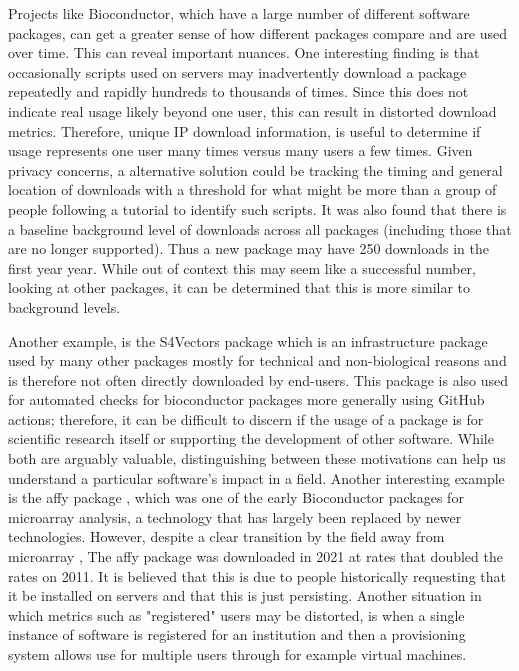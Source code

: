 \documentclass{article}
\begin{document}
Projects like Bioconductor, which have a large number of different software packages, can get a greater sense of how different packages compare and are used over time. This can reveal important nuances. One interesting finding is that occasionally scripts used on servers may inadvertently download a package repeatedly and rapidly hundreds to thousands of times. Since this does not indicate real usage likely beyond one user, this can result in distorted download metrics. Therefore, unique IP download information, is useful to determine if usage represents one user many times versus many users a few times. Given privacy concerns, a alternative solution could be tracking the timing and general location of downloads with a threshold for what might be more than a group of people following a tutorial to identify such scripts. It was also found that there is a baseline background level of downloads across all packages (including those that are no longer supported). Thus a new package may have 250 downloads in the first year year. While out of context this may seem like a successful number, looking at other packages, it can be determined that this is more similar to background levels.

Another example, is the S4Vectors package which is an infrastructure package used by many other packages mostly for technical and non-biological reasons and is therefore not often directly downloaded by end-users. This package is also used for automated checks for bioconductor packages more generally using GitHub actions; therefore, it can be difficult to discern if the usage of a package is for scientific research itself or supporting the development of other software. While both are arguably valuable, distinguishing between these motivations can help us understand a particular software's impact in a field.  Another interesting example is the affy package \cite{affy} , which was one of the early Bioconductor packages for microarray analysis, a technology that has largely been replaced by newer technologies. However, despite a clear transition by the field away from microarray \cite{mantione_comparing_2014}, The affy package was downloaded in 2021 at rates that doubled the rates on 2011. It is believed that this is due to people historically requesting that it be installed on servers and that this is just persisting. Another situation in which metrics such as "registered" users may be distorted, is when a single instance of software is registered for an institution and then a provisioning system allows use for multiple users through for example virtual machines. 
\end{document}
